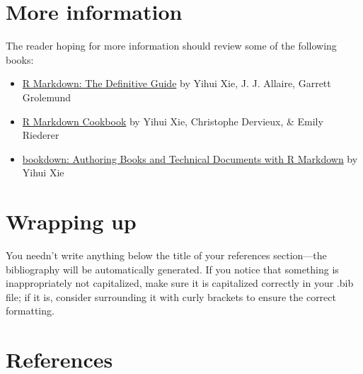 \documentclass[jou]{apa7}
\providecommand{\tightlist}{%
  \setlength{\itemsep}{0pt}\setlength{\parskip}{0pt}}
\begin{document}
\hypertarget{more-information}{%
\section{More information}\label{more-information}}

The reader hoping for more information should review some of the
following books:

\begin{itemize}
\tightlist
\item
  \href{https://bookdown.org/yihui/rmarkdown/}{R Markdown: The
  Definitive Guide} by Yihui Xie, J. J. Allaire, Garrett Grolemund
\item
  \href{https://bookdown.org/yihui/rmarkdown-cookbook/}{R Markdown
  Cookbook} by Yihui Xie, Christophe Dervieux, \& Emily Riederer
\item
  \href{https://bookdown.org/yihui/bookdown/}{bookdown: Authoring Books
  and Technical Documents with R Markdown} by Yihui Xie
\end{itemize}

\hypertarget{wrapping-up}{%
\section{Wrapping up}\label{wrapping-up}}

You needn't write anything below the title of your references
section---the bibliography will be automatically generated. If you
notice that something is inappropriately not capitalized, make sure it
is capitalized correctly in your .bib file; if it is, consider
surrounding it with curly brackets to ensure the correct formatting.

\hypertarget{references}{%
\section*{References}\label{references}}
\end{document}

